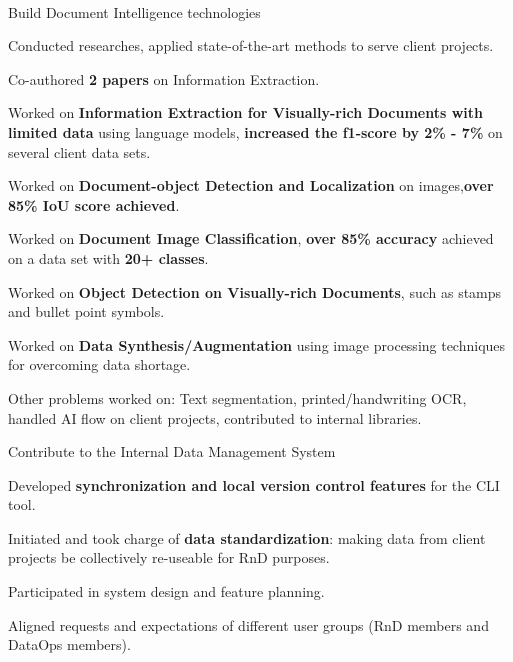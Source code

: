 \\
\begin{xitemize}
    \item Build Document Intelligence technologies
    \begin{zitemize}
        \item Conducted researches, applied state-of-the-art methods to serve client projects.
        \item Co-authored \textbf{2 papers} on Information Extraction.
        \item Worked on \textbf{Information Extraction for Visually-rich Documents with limited data} using language models, \textbf{increased the f1-score by 2\%  - 7\%} on several client data sets.
        \item Worked on \textbf{Document-object Detection and Localization} on images,\textbf{over 85\% IoU score achieved}.
        \item Worked on \textbf{Document Image Classification}, \textbf{over 85\% accuracy} achieved on a data set with \textbf{20+ classes}.
        \item Worked on \textbf{Object Detection on Visually-rich Documents}, such as stamps and bullet point symbols.
        \item Worked on \textbf{Data Synthesis/Augmentation} using image processing techniques for overcoming data shortage.
        \item Other problems worked on: Text segmentation, printed/handwriting OCR, handled AI flow on client projects, contributed to internal libraries.
    \end{zitemize}
    \item Contribute to the Internal Data Management System
    \begin{zitemize}
        \item Developed \textbf{synchronization and local version control features} for the CLI tool.
        \item Initiated and took charge of \textbf{data standardization}: making data from client projects be collectively re-useable for RnD purposes.
        \item Participated in system design and feature planning.
        \item Aligned requests and expectations of different user groups (RnD members and DataOps members).
    \end{zitemize}

\end{xitemize}
